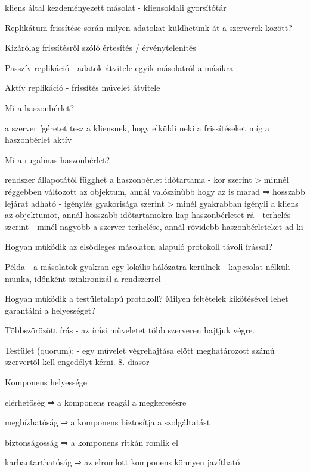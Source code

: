 \documentclass[12pt]{article}
\begin{document}
\begin{description}
    \item kliens által kezdeményezett másolat
        - kliensoldali gyorsítótár
    \item  Replikátum frissítése során milyen adatokat küldhetünk át a szerverek között?
    \item Kizárólag frissítésről szóló értesítés / érvénytelenítés
    \item Passzív replikáció
        - adatok átvitele egyik másolatról a másikra
    \item Aktív replikáció
        - frissítés művelet átvitele
    \item  Mi a haszonbérlet?	
    \item a szerver ígéretet tesz a kliensnek, hogy elküldi neki a frissítéseket míg a haszonbérlet aktív
    \item  Mi a rugalmas haszonbérlet?
    \item rendszer állapotától függhet a haszonbérlet időtartama
        - kor szerint 
        > minnél réggebben változott az objektum, annál valószínűbb hogy az is marad 
        ⇒ hosszabb lejárat adható
        - igénylés gyakorisága szerint
        > minél gyakrabban igényli a kliens az objektumot, annál hosszabb időtartamokra kap haszonbérletet rá
        - terhelés szerint
        - minél nagyobb a szerver terhelése, annál rövidebb haszonbérleteket ad ki 
    \item  Hogyan működik az elsődleges másolaton alapuló protokoll távoli írással?	
    \item Példa
        - a másolatok gyakran egy lokális hálózatra kerülnek
        - kapcsolat nélküli munka, időnként szinkronizál a rendszerrel	
    \item  Hogyan működik a testületalapú protokoll? Milyen feltételek kikötésével lehet garantálni a helyességet?
    \item Többszörözött írás
        - az írási műveletet több szerveren hajtjuk végre.
    \item Testület (quorum): 
        - egy művelet végrehajtása előtt meghatározott számú szervertől kell engedélyt kérni.
        8. diasor
    \item  Komponens helyessége
    \item elérhetőség       ⇒ a komponens reagál a megkeresésre
    \item megbízhatóság     ⇒ a komponens biztosítja a szolgáltatást
    \item biztonságosság    ⇒ a komponens ritkán romlik el
    \item karbantarthatóság ⇒ az elromlott komponens könnyen javítható

\end{description}
\end{document}
